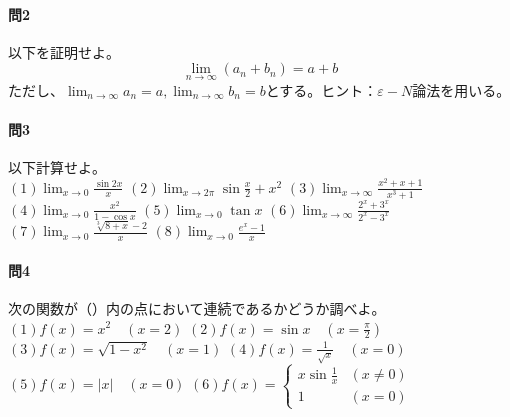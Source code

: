 \documentclass[a4j,dvipdfmx]{jsarticle}
\begin{document}
                \paragraph{問2}以下を証明せよ。
                \begin{equation*}
                    \lim_{n\to\infty}(a_n+b_n)=a+b
                \end{equation*}
                ただし、$\displaystyle\lim_{n\to\infty}a_n=a,\lim_{n\to\infty}b_n=b$とする。{\scriptsize ヒント：$\varepsilon-N$論法を用いる。}

                \paragraph{問3}以下計算せよ。\\

                \noindent
                $(1)\displaystyle \lim_{x\to 0}\frac{\sin2x}{x}$\hspace{3mm}
                $(2)\displaystyle \lim_{x\to 2\pi}\sin \frac{x}{2}+x^2$\hspace{3mm}
                $(3)\displaystyle \lim_{x\to\infty}\frac{x^2+x+1}{x^3+1}$\hspace{3mm}
                $(4)\displaystyle \lim_{x\to 0}\frac{x^2}{1-\cos x}$\hspace{3mm}
                $(5)\displaystyle \lim_{x\to 0}\tan x$\hspace{3mm}
                $(6)\displaystyle \lim_{x\to\infty}\frac{2^x+3^x}{2^x-3^x}$\\
                $(7)\displaystyle \lim_{x\to 0}\frac{\sqrt[3]{8+x}-2}{x}$\hspace{3mm}
                $(8)\displaystyle \lim_{x\to 0}\frac{e^x-1}{x}$
                
                \paragraph{問4}次の関数が（）内の点において連続であるかどうか調べよ。\\
                $(1)f(x)=x^2\quad(x=2)$\hspace{1mm}
                $(2)f(x)=\sin x\quad(x=\frac{\pi}{2})$\hspace{1mm}
                $(3)f(x)=\sqrt{1-x^2}\quad(x=1)$\hspace{1mm}
                $(4)f(x)=\frac{1}{\sqrt{x}}\quad(x=0)$\\
                $(5)f(x)=|x|\quad(x=0)$\hspace{1mm}
                $(6)\displaystyle f(x)=\left\{\begin{array}{lr}\displaystyle x\sin\frac{1}{x}&(x\neq 0)\\1&(x=0)\end{array}\right.$\\
\end{document}
